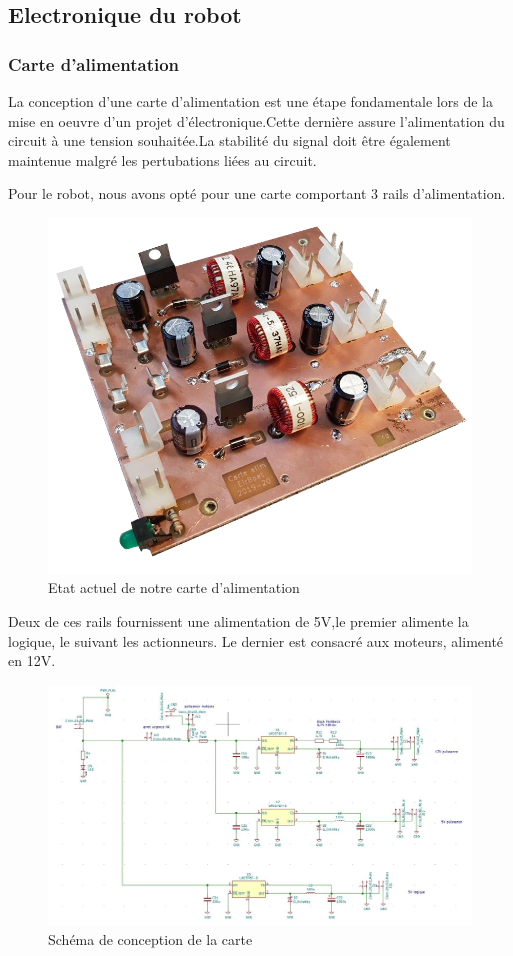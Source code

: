 \documentclass[a4paper,10pt]{article}
\begin{document}
\begin{spacing}{1.5}
\subsection{Electronique du robot}
\subsubsection{Carte d'alimentation}

La conception d'une carte d'alimentation est une étape fondamentale lors de la
mise en oeuvre d'un projet d'électronique.Cette dernière assure l'alimentation
du circuit à une tension souhaitée.La stabilité du signal doit être également
maintenue malgré les pertubations liées au circuit.

Pour le robot, nous avons opté pour une carte comportant 3 rails
d'alimentation.

\begin{figure}[H]
  \center
  \includegraphics[scale=0.3]{carte.png}
  \caption{Etat actuel de notre carte d'alimentation}
\end{figure}

Deux de ces rails fournissent une alimentation de 5V,le premier alimente la
logique, le suivant les actionneurs. Le dernier est consacré aux moteurs,
alimenté en 12V.

\begin{figure}[H]
  \center
  \includegraphics[scale=0.5]{schema.jpg}
  \caption{Schéma de conception de la carte}
\end{figure}


\end{spacing}
\end{document}
